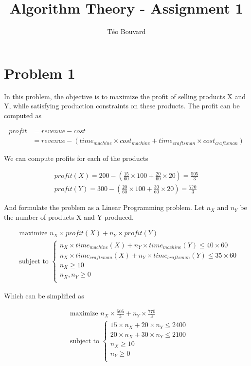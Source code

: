 \documentclass[a4paper, 10pt, twoside]{article}
\begin{document}
\title{Algorithm Theory - Assignment 1}
\author{T\'eo Bouvard}
\maketitle

\section*{Problem 1}
In this problem, the objective is to maximize the profit of selling products X and Y, while satisfying production constraints on these products. The profit can be computed as 

\begin{align*}
    profit &= revenue - cost \\
    &= revenue - (time_{machine} \times cost_{machine} + time_{craftsman} \times cost_{craftsman})
\end{align*}

We can compute profits for each of the products

\begin{align*}
    profit(X) = 200 - (\frac{15}{60} \times 100 + \frac{20}{60} \times 20) = \frac{505}{3} \\
    profit(Y) = 300 - (\frac{20}{60} \times 100 + \frac{30}{60} \times 20) = \frac{770}{3}
\end{align*}

And formulate the problem as a Linear Programming problem. Let $n_X$ and $n_Y$ be the number of products X and Y produced.

\begin{align*}
    &\text{maximize } n_X \times profit(X) + n_Y \times profit(Y) \\
    &\text{subject to } 
    \begin{cases}
        n_X \times time_{machine}(X) + n_Y \times time_{machine}(Y) \le 40 \times 60 \\
        n_X \times time_{craftsman}(X) + n_Y \times time_{craftsman}(Y) \le 35 \times 60 \\
        n_X \ge 10 \\
        n_X, n_Y \ge 0 \\
    \end{cases} 
\end{align*}

Which can be simplified as

\begin{align*}
    &\text{maximize } n_X \times \frac{505}{3} + n_Y \times \frac{770}{3} \\
    &\text{subject to } 
    \begin{cases}
        15 \times n_X + 20 \times n_Y \le 2400 \\
        20 \times n_X + 30 \times n_Y \le 2100 \\
        n_X \ge 10 \\
        n_Y \ge 0 \\
    \end{cases} 
\end{align*}
\end{document}
